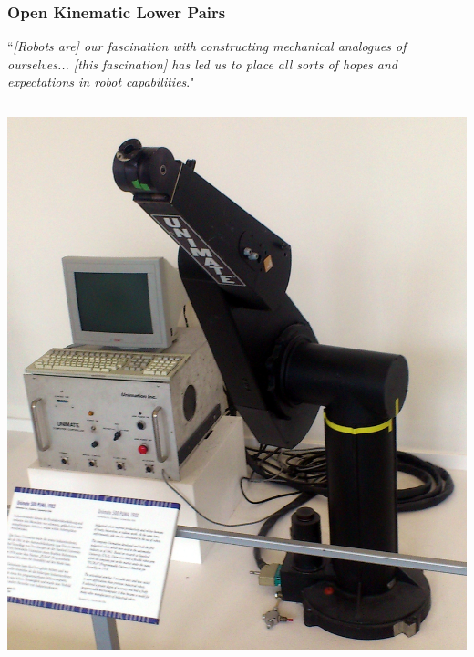	
	\begin{frame}
		\frametitle{Open Kinematic Lower Pairs}
		\begin{definition}
			``\footnotesize \textit{[Robots are] our fascination with constructing mechanical analogues of ourselves... [this fascination] has led us to place all sorts of hopes and expectations in robot capabilities}."
		\end{definition}
		\begin{columns}[t]
			\begin{column}{5cm}
				\begin{minipage}[b]{.5\textwidth}
					\includegraphics[width=1.5\textwidth, height=1.5\textwidth]{../Notes/figures/PUMA.jpg} \\

\end{minipage}
\end{column}
\end{columns}
\end{frame}
